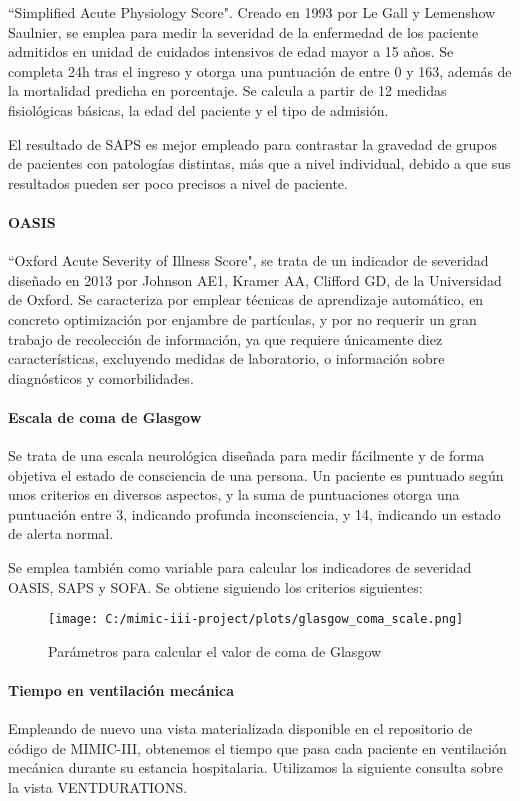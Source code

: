 \documentclass{report}
\begin{document}
``Simplified Acute Physiology Score". Creado en 1993 por Le Gall y
Lemenshow Saulnier, se emplea para medir la severidad de la enfermedad
de los paciente admitidos en unidad de cuidados intensivos de edad mayor
a 15 años. Se completa 24h tras el ingreso y otorga una puntuación de
entre 0 y 163, además de la mortalidad predicha en porcentaje. Se
calcula a partir de 12 medidas fisiológicas básicas, la edad del
paciente y el tipo de admisión.

El resultado de SAPS es mejor empleado para contrastar la gravedad de
grupos de pacientes con patologías distintas, más que a nivel
individual, debido a que sus resultados pueden ser poco precisos a nivel
de paciente.

\paragraph{OASIS}

``Oxford Acute Severity of Illness Score", se trata de un indicador
de severidad diseñado en 2013 por Johnson AE1, Kramer AA, Clifford GD,
de la Universidad de Oxford. Se caracteriza por emplear técnicas de
aprendizaje automático, en concreto optimización por enjambre de
partículas, y por no requerir un gran trabajo de recolección de
información, ya que requiere únicamente diez características, excluyendo
medidas de laboratorio, o información sobre diagnósticos y
comorbilidades.

\paragraph{Escala de coma de Glasgow}

Se trata de una escala neurológica diseñada para medir fácilmente y de
forma objetiva el estado de consciencia de una persona. Un paciente es
puntuado según unos criterios en diversos aspectos, y la suma de
puntuaciones otorga una puntuación entre 3, indicando profunda
inconsciencia, y 14, indicando un estado de alerta normal.

Se emplea también como variable para calcular los indicadores de
severidad OASIS, SAPS y SOFA. Se obtiene siguiendo los criterios
siguientes:

\begin{figure}[H]
\centering
\texttt{[image: C:/mimic-iii-project/plots/glasgow\_coma\_scale.png]}
\caption{Parámetros para calcular el valor de coma de Glasgow}
\end{figure}

\paragraph{Tiempo en ventilación mecánica}
Empleando de nuevo una vista materializada disponible en el repositorio
de código de MIMIC-III, obtenemos el tiempo que pasa cada paciente en
ventilación mecánica durante su estancia hospitalaria. Utilizamos la
siguiente consulta sobre la vista VENTDURATIONS.
\end{document}
